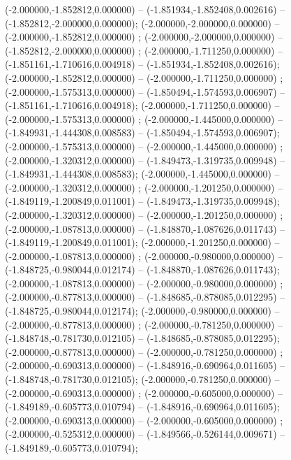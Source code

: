  (-2.000000,-1.852812,0.000000) -- (-1.851934,-1.852408,0.002616) -- (-1.852812,-2.000000,0.000000);
 (-2.000000,-2.000000,0.000000) -- (-2.000000,-1.852812,0.000000) ;
 (-2.000000,-2.000000,0.000000) -- (-1.852812,-2.000000,0.000000) ;
 (-2.000000,-1.711250,0.000000) -- (-1.851161,-1.710616,0.004918) -- (-1.851934,-1.852408,0.002616);
 (-2.000000,-1.852812,0.000000) -- (-2.000000,-1.711250,0.000000) ;
 (-2.000000,-1.575313,0.000000) -- (-1.850494,-1.574593,0.006907) -- (-1.851161,-1.710616,0.004918);
 (-2.000000,-1.711250,0.000000) -- (-2.000000,-1.575313,0.000000) ;
 (-2.000000,-1.445000,0.000000) -- (-1.849931,-1.444308,0.008583) -- (-1.850494,-1.574593,0.006907);
 (-2.000000,-1.575313,0.000000) -- (-2.000000,-1.445000,0.000000) ;
 (-2.000000,-1.320312,0.000000) -- (-1.849473,-1.319735,0.009948) -- (-1.849931,-1.444308,0.008583);
 (-2.000000,-1.445000,0.000000) -- (-2.000000,-1.320312,0.000000) ;
 (-2.000000,-1.201250,0.000000) -- (-1.849119,-1.200849,0.011001) -- (-1.849473,-1.319735,0.009948);
 (-2.000000,-1.320312,0.000000) -- (-2.000000,-1.201250,0.000000) ;
 (-2.000000,-1.087813,0.000000) -- (-1.848870,-1.087626,0.011743) -- (-1.849119,-1.200849,0.011001);
 (-2.000000,-1.201250,0.000000) -- (-2.000000,-1.087813,0.000000) ;
 (-2.000000,-0.980000,0.000000) -- (-1.848725,-0.980044,0.012174) -- (-1.848870,-1.087626,0.011743);
 (-2.000000,-1.087813,0.000000) -- (-2.000000,-0.980000,0.000000) ;
 (-2.000000,-0.877813,0.000000) -- (-1.848685,-0.878085,0.012295) -- (-1.848725,-0.980044,0.012174);
 (-2.000000,-0.980000,0.000000) -- (-2.000000,-0.877813,0.000000) ;
 (-2.000000,-0.781250,0.000000) -- (-1.848748,-0.781730,0.012105) -- (-1.848685,-0.878085,0.012295);
 (-2.000000,-0.877813,0.000000) -- (-2.000000,-0.781250,0.000000) ;
 (-2.000000,-0.690313,0.000000) -- (-1.848916,-0.690964,0.011605) -- (-1.848748,-0.781730,0.012105);
 (-2.000000,-0.781250,0.000000) -- (-2.000000,-0.690313,0.000000) ;
 (-2.000000,-0.605000,0.000000) -- (-1.849189,-0.605773,0.010794) -- (-1.848916,-0.690964,0.011605);
 (-2.000000,-0.690313,0.000000) -- (-2.000000,-0.605000,0.000000) ;
 (-2.000000,-0.525312,0.000000) -- (-1.849566,-0.526144,0.009671) -- (-1.849189,-0.605773,0.010794);
